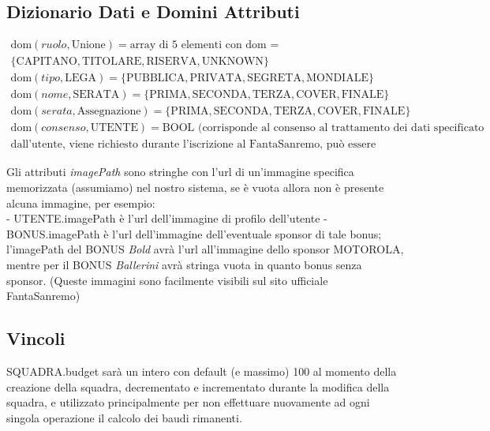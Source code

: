 \documentclass[a4paper, 12pt]{article}
\begin{document}
\subsection{Dizionario Dati e Domini Attributi}

\[
\begin{array}{ll}
\text{dom}(ruolo, \text{Unione}) = \text {array di 5 elementi con dom = } \\ 
    \{ \text{CAPITANO}, \text{TITOLARE}, \text{RISERVA}, \text{UNKNOWN} \} \\
\text{dom}(tipo, \text{LEGA}) = \{ \text{PUBBLICA}, \text{PRIVATA}, \text{SEGRETA}, \text{MONDIALE} \} \\
\text{dom}(nome, \text{SERATA}) = \{ \text{PRIMA}, \text{SECONDA}, \text{TERZA}, \text{COVER}, \text{FINALE} \} \\
\text{dom}(serata, \text{Assegnazione}) = \{ \text{PRIMA}, \text{SECONDA}, \text{TERZA}, \text{COVER}, \text{FINALE} \} \\
\text{dom}(consenso, \text{UTENTE}) = \text{BOOL (corrisponde al consenso al trattamento dei dati specificato} \\
\text{dall'utente, viene richiesto durante l'iscrizione al FantaSanremo, può essere modificato)}
\end{array}
\]

Gli attributi \textit{imagePath} sono stringhe con l'url di un'immagine specifica memorizzata (assumiamo) nel nostro sistema, se è vuota allora non è presente alcuna immagine, per esempio: \\
- UTENTE.imagePath è l'url dell'immagine di profilo dell'utente \newline
- BONUS.imagePath è l'url dell'immagine dell'eventuale sponsor di tale bonus; l'imagePath del BONUS \textit{Bold} avrà l'url all'immagine dello sponsor MOTOROLA, mentre per il BONUS \textit{Ballerini} avrà stringa vuota in quanto bonus senza sponsor. \newline
(Queste immagini sono facilmente visibili sul sito ufficiale FantaSanremo)

\subsection{Vincoli}
SQUADRA.budget sarà un intero con default (e massimo) 100 al momento della creazione della squadra, decrementato e incrementato durante la modifica della squadra, e utilizzato principalmente per non effettuare nuovamente ad ogni singola operazione il calcolo dei baudi rimanenti.
\end{document}
